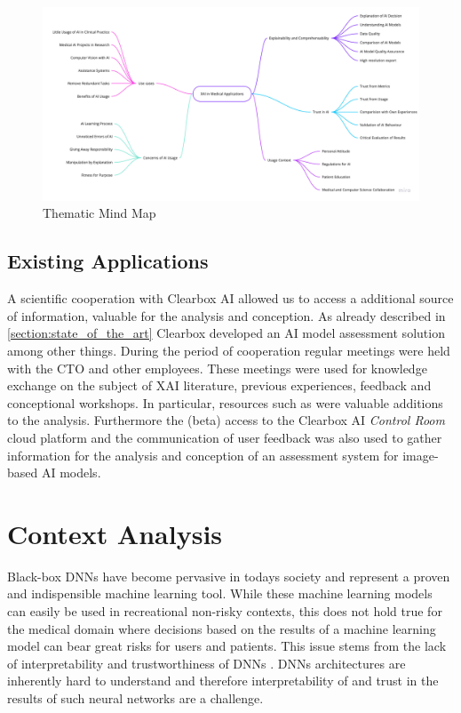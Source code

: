 \documentclass[11pt,a4paper,english]{scrreprt}
\begin{document}
\begin{figure}[htbp]
    \centering
    \includegraphics[height=0.8\textwidth, angle=90]{img/figures/Thematic_Mind_Map.pdf}
    \caption{Thematic Mind Map}
    \label{fig:thematic_mind_map}
\end{figure}

\subsection{Existing Applications}\label{subsection:existing_apps}
A scientific cooperation with Clearbox AI allowed us to access a additional source of information, valuable for the analysis and conception. As already described in \autoref{section:state_of_the_art} Clearbox developed an AI model assessment solution among other things. During the period of cooperation regular meetings were held with the CTO and other employees. These meetings were used for knowledge exchange on the subject of XAI literature, previous experiences, feedback and conceptional workshops. In particular, resources such as \textcite{people_ai_google_website,captum_website,streamlit_website} were valuable additions to the analysis. Furthermore the (beta) access to the Clearbox AI \textit{Control Room} cloud platform and the communication of user feedback was also used to gather information for the analysis and conception of an assessment system for image-based AI models.

\section{Context Analysis}
Black-box DNNs have become pervasive in todays society and represent a proven and indispensible machine learning tool. While these machine learning models can easily be used in recreational non-risky contexts, this does not hold true for the medical domain where decisions based on the results of a machine learning model can bear great risks for users and patients. This issue stems from the lack of interpretability and trustworthiness of DNNs \parencite{adadi_blackbox_2018}. DNNs architectures are inherently hard to understand and therefore interpretability of and trust in the results of such neural networks are a challenge.
\end{document}
